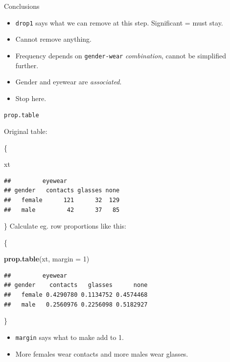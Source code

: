 \documentclass[ignorenonframetext,]{beamer}
\newenvironment{Shaded}{\begin{snugshade}}{\end{snugshade}}
\newcommand{\DataTypeTok}[1]{\textcolor[rgb]{0.13,0.29,0.53}{#1}}
\newcommand{\DecValTok}[1]{\textcolor[rgb]{0.00,0.00,0.81}{#1}}
\newcommand{\KeywordTok}[1]{\textcolor[rgb]{0.13,0.29,0.53}{\textbf{#1}}}
\newcommand{\NormalTok}[1]{#1}
\begin{document}
\begin{frame}[fragile]{Conclusions}
\protect\hypertarget{conclusions-3}{}

\begin{itemize}
\item
  \texttt{drop1} says what we can remove at this step. Significant =
  must stay.
\item
  Cannot remove anything.
\item
  Frequency depends on \texttt{gender-wear} \emph{combination}, cannot
  be simplified further.
\item
  Gender and eyewear are \emph{associated}.
\item
  Stop here.
\end{itemize}

\end{frame}

\begin{frame}[fragile]{\texttt{prop.table}}
\protect\hypertarget{prop.table}{}

Original table:

\{\footnotesize

\begin{Shaded}
\begin{Highlighting}[]
\NormalTok{xt}
\end{Highlighting}
\end{Shaded}

\begin{verbatim}
##         eyewear
## gender   contacts glasses none
##   female      121      32  129
##   male         42      37   85
\end{verbatim}

\} Calculate eg. row proportions like this:

\{\small

\begin{Shaded}
\begin{Highlighting}[]
\KeywordTok{prop.table}\NormalTok{(xt, }\DataTypeTok{margin =} \DecValTok{1}\NormalTok{)}
\end{Highlighting}
\end{Shaded}

\begin{verbatim}
##         eyewear
## gender    contacts   glasses      none
##   female 0.4290780 0.1134752 0.4574468
##   male   0.2560976 0.2256098 0.5182927
\end{verbatim}

\}

\begin{itemize}
\item
  \texttt{margin} says what to make add to 1.
\item
  More females wear contacts and more males wear glasses.
\end{itemize}

\end{frame}
\end{document}
